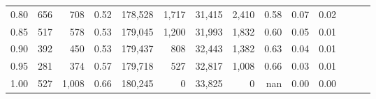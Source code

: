 \begin{tabular}{rrrrrrrrrrrrrr}
0.80 &     656 &    708 &  0.52 &  178,528 &    1,717 &  31,415 &   2,410 &  0.58 &  0.07 &      0.02 \\
0.85 &     517 &    578 &  0.53 &  179,045 &    1,200 &  31,993 &   1,832 &  0.60 &  0.05 &      0.01 \\
0.90 &     392 &    450 &  0.53 &  179,437 &      808 &  32,443 &   1,382 &  0.63 &  0.04 &      0.01 \\
0.95 &     281 &    374 &  0.57 &  179,718 &      527 &  32,817 &   1,008 &  0.66 &  0.03 &      0.01 \\
1.00 &     527 &  1,008 &  0.66 &  180,245 &        0 &  33,825 &       0 &   nan &  0.00 &      0.00 \\
\bottomrule
\end{tabular}
